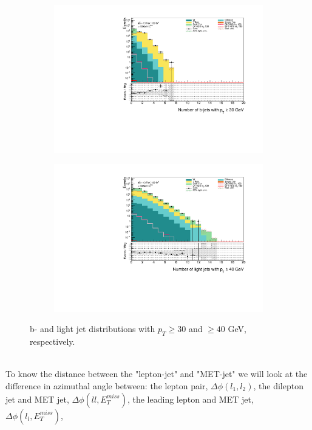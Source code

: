 \documentclass[12pt, a4paper]{book}
\begin{document}
\begin{figure}[!ht]
    \centering
    \hfill\begin{subfigure}[b]{0.49\textwidth}
        \centering
        \includegraphics[width=\textwidth]{bjetsPt30.pdf}
    \end{subfigure}
    \hfill\begin{subfigure}[b]{0.49\textwidth}
        \centering
        \includegraphics[width=\textwidth]{ljetsPt40.pdf}
    \end{subfigure}
    \caption[b- and light jet distributions in control region]{b- and light jet distributions with $p_T \ge30$ and $\ge40$ GeV, respectively.}\label{fig:jetcuts}
\end{figure}
\graphicspath{{../../../Plots/Data_Analysis/SRs/Control_region/}} 
\\To know the distance between the "lepton-jet" and "MET-jet" we will look at the difference in azimuthal angle between: the lepton pair, $\Delta\phi(l_1,l_2)$, the dilepton jet and MET jet, $\Delta\phi(ll,E_T^{miss})$, the leading lepton and MET jet, $\Delta\phi(l_l,E_T^{miss})$, 
\end{document}
